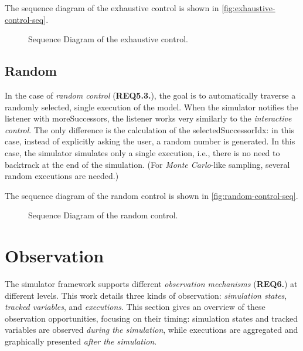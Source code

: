 The sequence diagram of the exhaustive control is shown in \autoref{fig:exhaustive-control-seq}.

\begin{figure}[ht]
	\centering
	
	\caption{Sequence Diagram of the exhaustive control.}
	\label{fig:exhaustive-control-seq}
\end{figure}

\subsection{Random}
In the case of \textit{random control} (\textbf{REQ5.3.}), the goal is to automatically traverse a randomly selected, single execution of the model. When the simulator notifies the listener with \textsf{moreSuccessors}, the listener works very similarly to the \textit{interactive control}. The only difference is the calculation of the \textsf{selectedSuccessorIdx}: in this case, instead of explicitly asking the user, a random number is generated. In this case, the simulator simulates only a single execution, i.e., there is no need to backtrack at the end of the simulation. (For \textit{Monte Carlo}-like sampling, several random executions are needed.)

The sequence diagram of the random control is shown in \autoref{fig:random-control-seq}.

\begin{figure}[ht]
	\centering
	
	\caption{Sequence Diagram of the random control.}
	\label{fig:random-control-seq}
\end{figure}

\section{Observation}

The simulator framework supports different \textit{observation mechanisms} (\textbf{REQ6.}) at different levels. This work details three kinds of observation: \textit{simulation states}, \textit{tracked variables}, and \textit{executions}. This section gives an overview of these observation opportunities, focusing on their timing: simulation states and tracked variables are observed \textit{during the simulation}, while executions are aggregated and graphically presented \textit{after the simulation}.

